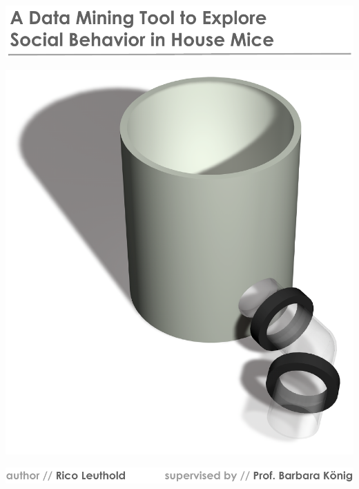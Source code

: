 \documentclass[a4paper,10pt,twoside,headings=small,bibliography=totocnumbered,headsepline]{scrartcl}
\begin{document}


\begin{titlepage}
\thispagestyle{empty}
\begin{flushleft}
\includegraphics[width=\textwidth]{assets/pdf/title.pdf}
\end{flushleft}
\vspace{3cm}
\begin{adjustwidth}{-.5cm}{-2cm}%
\includegraphics[width=.8\textwidth]{assets/pdf/title_box.pdf}
\end{adjustwidth}
\vfill

\includegraphics[width=\textwidth]{assets/pdf/title_footer.pdf}

\end{titlepage}

\tableofcontents
\listoftables
\listoffigures


\end{document}
